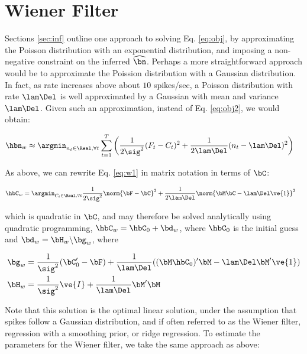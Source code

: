 \section{Wiener Filter} \label{sec:wiener}

Sections \ref{sec:inf} outline one approach to solving Eq. \eqref{eq:obj}, by approximating the Poisson distribution with an exponential distribution, and imposing a non-negative constraint on the inferred $\hnm$.  Perhaps a more straightforward approach would be to approximate the Poission distribution with a Gaussian distribution.  In fact, as rate increases above about $10$ spikes/sec, a Poisson distribution with rate $\lam \Del$ is well approximated by a Gaussian with mean and variance $\lam \Del$.  Given such an approximation, instead of Eq. \eqref{eq:obj2}, we would obtain:

\begin{align} \label{eq:w1}
\hbn_{w} &\approx \argmin_{n_t \in \Real, \forall t} \sum_{t=1}^T \bigg(\frac{1}{2\sig^2} (F_t-C_t)^2 + \frac{1}{2 \lam \Del} (n_t - \lam \Del)^2\bigg)%
\end{align}

\noindent As above, we can rewrite Eq. \eqref{eq:w1} in matrix notation in terms of $\bC$:

\begin{align}   \label{eq:w2}
\hbC_{w}&= \argmin_{C_t \in \Real, \forall t} \frac{1}{2\sig^2} \norm{\bF - \bC}^2 + \frac{1}{2\lam\Del} \norm{\bM \bC - \lam\Del\ve{1}}^2 
\end{align}

\noindent which is quadratic in $\bC$, and may therefore be solved analytically using quadratic programming, $\hbC_w = \hbC_0 + \bd_w$, where $\hbC_0$ is the initial guess and $\bd_w=\bH_w \backslash \bg_w$, where

\begin{align}
\bg_w &= \frac{1}{\sig^2} (\bC_0' - \bF) + \frac{1}{\lam\Del} ( (\bM \hbC_0)' \bM - \lam\Del \bM' \ve{1}) \\
\bH_w &= \frac{1}{\sig^2} \ve{I} + \frac{1}{\lam\Del} \bM' \bM
\end{align}

Note that this solution is the optimal linear solution, under the assumption that spikes follow a Gaussian distribution, and if often referred to as the Wiener filter, regression with a smoothing prior, or ridge regression.  To estimate the parameters for the Wiener filter, we take the same approach as above:

